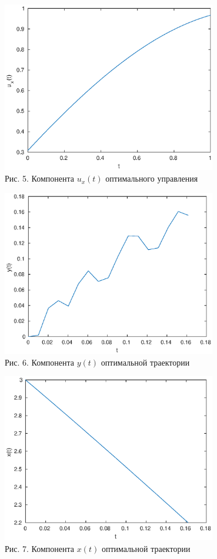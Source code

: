 \documentclass[11pt]{article}
\begin{document}
	\newpage

\begin{center}
	\includegraphics[width=0.7\textwidth]{pic_5.eps}\\
	{Рис. 5. Компонента $u_x(t)$ оптимального управления}
\end{center}
\begin{center}	
	\includegraphics[width= 0.7\textwidth ]{pic_6.eps}\\		
	{Рис. 6. Компонента $y(t)$ оптимальной траектории}
\end{center}

	\newpage

\begin{center}
	\includegraphics[width=0.7\textwidth]{pic_7.eps}\\
	{Рис. 7. Компонента $x(t)$ оптимальной траектории}
\end{center}
\end{document}

